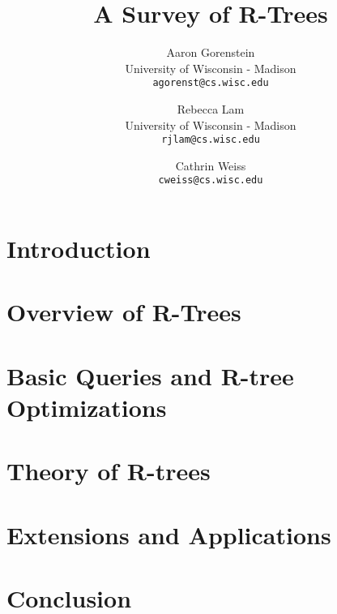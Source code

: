 \documentclass[10pt, twocolumn]{article}
\title{A Survey of R-Trees}
\author{
	Aaron Gorenstein\\
	University of Wisconsin - Madison\\
	\texttt{agorenst@cs.wisc.edu}
	\and
	Rebecca Lam\\
	University of Wisconsin - Madison\\
	\texttt{rjlam@cs.wisc.edu}
	\and
	Cathrin Weiss\\
	\texttt{cweiss@cs.wisc.edu}
}
\begin{document}
\newcommand{\rbase}{R}
\newcommand{\rstar}{$\text{R}^*$}
\newcommand{\rplus}{$\text{R}^+$}

\maketitle
\thispagestyle{empty}



\section{Introduction}
\label{sec:intro}


\section{Overview of R-Trees}
\label{sec:overview}


\section{Basic Queries and R-tree Optimizations}
\label{sec:impchal}


\section{Theory of R-trees}
\label{sec:dbchal}


\section{Extensions and Applications}
\label{sec:apps}


\section{Conclusion}
\label{sec:conc}




\end{document}
